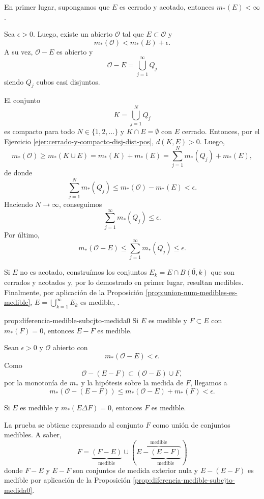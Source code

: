 \begin{demo}{}
En primer lugar, supongamos que $E$ es cerrado y  acotado, entonces $m_{*}(E)<\infty$. 

Sea $\epsilon>0$. Luego, existe un abierto $\mathcal{O}$ tal que 
$E\subset \mathcal{O}$ y 
\[
m_{*}(\mathcal{O})<m_{*}(E)+\epsilon.
\]
A su vez, $\mathcal{O}-E$ es abierto y 
\[
\mathcal{O}-E=\bigcup\limits_{j=1}^{\infty} Q_j
\]
siendo $Q_j$ cubos casi disjuntos. 

El conjunto 
\[
K=\bigcup\limits_{j=1}^N Q_j
\]
es compacto para todo $N \in \{1,2,\ldots\}$ y $K\cap E=\emptyset$ con $E$ cerrado.
Entonces, por el Ejercicio \ref{ejer:cerrado-y-compacto-disj-dist-pos},  $d(K,E)>0$. Luego, 
\[
m_{*}(\mathcal{O})\geq  m_{*}(K\cup E)=m_{*}(K)+m_{*}(E)=
\sum\limits_{j=1}^N m_{*}(Q_j)+m_{*}(E),
\]
de donde
\[
\sum\limits_{j=1}^N m_{*}(Q_j) \leq m_{*}(\mathcal{O})-m_{*}(E)<\epsilon.
\]
Haciendo $N\to \infty$, conseguimos
\[
\sum\limits_{j=1}^{\infty} m_{*}(Q_j)\leq \epsilon.
\]
Por \'ultimo, 
\[
m_{*}(\mathcal{O}-E)\leq \sum\limits_{j=1}^{\infty} m_{*}(Q_j)\leq \epsilon.
\]

Si $E$ no es acotado, constru\'imos  los conjuntos $E_k=E\cap \overline{B(0,k)}$ que son cerrados y acotados y, por lo demostrado en primer lugar, resultan medibles.
Finalmente, por aplicaci\'on de la Proposici\'on \ref{prop:union-num-medibles-es-medible}, 
$E=\bigcup\limits_{k=1}^{\infty}E_k$ es medible, . 
\end{demo}

\begin{proposicion}{prop:diferencia-medible-subcjto-medida0}
Si $E$ es medible y $F\subset E$ con $m_{*}(F)=0$, entonces
$E-F$ es medible.
\end{proposicion}

\begin{demo}{}
Sean $\epsilon>0$ y $\mathcal{O}$ abierto con 
\[
m_{*}(\mathcal{O}-E)<\epsilon.
\]
Como
\[
\mathcal{O}-(E-F)\subset (\mathcal{O}-E)\cup F, 
\]
por la monoton\'ia de $m_{*}$ y la hip\'otesis sobre la medida de $F$, llegamos a 
\[
m_{*}\left(\mathcal{O}-(E-F)\right)\leq m_{*}(\mathcal{O}-E)+m_{*}(F)<\epsilon.
\]
\end{demo}

\begin{corolario}{}
Si $E$ es medible  y $m_{*}(E \Delta F)=0$, entonces $F$ es medible.
\end{corolario}

\begin{demo}{}
La prueba se obtiene expresando al conjunto $F$ como uni\'on de conjuntos medibles. A saber, 
\[
F=\underbrace{(F-E)}_{\mbox{medible}} \cup 
\left( 
\overbrace{E-\underbrace{(E-F)}_{\mbox{medible}}}^{\mbox{medible}}\right)
\]
donde $F-E$ y $E-F$ son conjuntos de medida exterior nula y 
$E-(E-F)$  es medible por aplicaci\'on de la Proposici\'on \ref{prop:diferencia-medible-subcjto-medida0}.
\end{demo}



